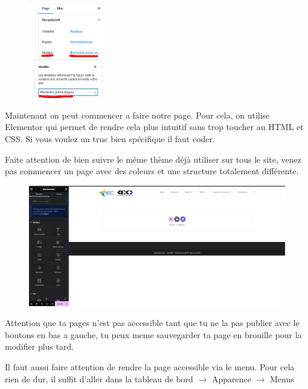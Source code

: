 \documentclass[12pt]{article}
\begin{document}
		\begin{figure}[htp]
			\centering
			\includegraphics[width=0.3\textwidth]{img/Modele.png}
		\end{figure}
		
		Maintenant on peut commencer a faire notre page. Pour cela, on utilise Elementor qui permet de rendre cela plus intuitif sans trop toucher au HTML et CSS. Si vous voulez un truc bien spécifique il faut coder.
		
		Faite attention de bien suivre le même thème déjà utiliser sur tous le site, venez pas commencer un page avec des coleurs et une structure totalement différente.
		
		\begin{figure}[htp]
			\centering
			\includegraphics[width=.82\textwidth]{img/PageCreate.png}
		\end{figure}
		
		Attention que ta pages n'est pas accessible tant que tu ne la pas publier avec le boutons en bas a gauche, tu peux meme sauvegarder ta page en brouille pour la modifier plus tard.
		
		Il faut aussi faire attention de rendre la page accessible via le menu. Pour cela rien de dur, il suffit d'aller dans la tableau de bord $\rightarrow$ Apparence $\rightarrow$ Menus
		
\end{document}
